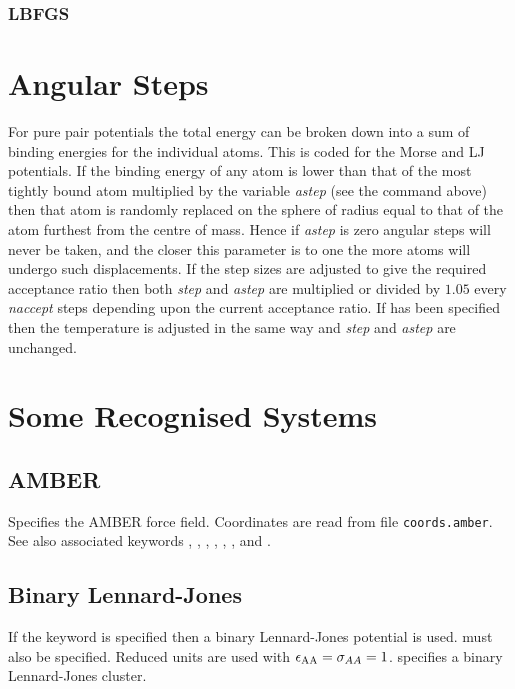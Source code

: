 {\subsubsection{LBFGS}


\section{Angular Steps}

For pure pair potentials the total energy can be broken down into a sum of binding
energies for the individual atoms. This is coded for the Morse and LJ potentials.
If the binding energy of any atom is lower than that of the most tightly bound atom
multiplied by the variable {\it astep\/} (see the {\/} command above) then
that atom is randomly replaced on the sphere of radius equal to that of the atom furthest
from the centre of mass. Hence if {\it astep\/} is zero angular steps will never be taken,
and the closer this parameter is to one the more atoms will undergo such displacements.
If the step sizes are adjusted to give the required acceptance ratio then both {\it step\/} and
{\it astep\/} are multiplied or divided by $1.05$ every {\it naccept\/} steps depending
upon the current acceptance ratio. If {\/} has been specified then the temperature
is adjusted in the same way and {\it step\/} and {\it astep\/} are unchanged.

\section{Some Recognised Systems}

\subsection{AMBER}

Specifies the AMBER force field. Coordinates are read from file {\tt coords.amber}.
See also associated keywords {\/}, {\/}, {\/}, {\/},
{\/}, {\/}, {\/} and {\/}.

\subsection{Binary Lennard-Jones}

If the {\/} keyword is specified then a binary Lennard-Jones
potential is used\cite{sastryds98}. {\/} must also be
specified. Reduced units are used with $\epsilon_{\rm AA}=\sigma_{AA}=1$.
{\/} specifies a binary Lennard-Jones cluster.

}
